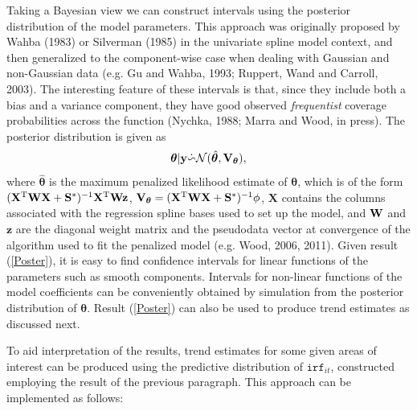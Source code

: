 Taking a Bayesian view we can construct intervals using the posterior distribution of the model parameters. This approach was originally proposed by Wahba (1983) or Silverman (1985) in the univariate spline model context, and then generalized to the component-wise case when dealing with Gaussian and non-Gaussian data (e.g. Gu and Wahba, 1993; Ruppert, Wand and Carroll, 2003). The interesting feature of these intervals is that, since they include both a bias and a variance component, they have good observed \textit{frequentist} coverage probabilities across the function (Nychka, 1988; Marra and Wood, in press). The posterior distribution is given as
\begin{equation}
\bm\theta|{\bf y} \dot{\backsim} \mathcal{N}( \hat{\bm\theta}, {\bf V}_{\bm\theta} ),
\label{Poster}
\end{equation}
where $\hat{\bm\theta}$ is the maximum penalized likelihood estimate of $\bm\theta$, which is of the form $(\mathbf{X}^\text{T}{\bf W}\mathbf{X}+{\bf S}^*)^{-1}\mathbf{X}^\text{T}{\bf W}{\bf z}$, ${\bf V}_{\bm\theta} = (\mathbf{X}^\text{T}{\bf W}\mathbf{X}+{\bf S}^*)^{-1}\phi$, $\mathbf{X}$ contains the columns associated with the regression spline bases used to set up the model, and ${\bf W}$ and $\mathbf{z}$ are the diagonal weight matrix and the pseudodata vector at convergence of the algorithm used to fit the penalized model (e.g. Wood, 2006, 2011). Given result (\ref{Poster}), it is easy to find confidence intervals for linear functions of the parameters such as smooth components. Intervals for non-linear functions of the model coefficients can be conveniently obtained by simulation from the posterior distribution of $\bm\theta$. Result (\ref{Poster}) can also be used to produce trend estimates as discussed next.

To aid interpretation of the results, trend estimates for some given areas of interest can be produced using the predictive distribution of $\texttt{irf}_{it}$, constructed employing the result of the previous paragraph. This approach can be implemented as follows:


